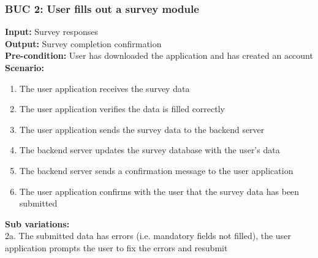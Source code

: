 \documentclass[12pt]{article}
\begin{document}
\subsubsection*{BUC 2: User fills out a survey module}
\textbf{Input:} Survey responses \\
\textbf{Output:} Survey completion confirmation \\
\textbf{Pre-condition:} User has downloaded the application and has created an account \\
\textbf{Scenario:} \\
\begin{enumerate}
  \item The user application receives the survey data
  \item The user application verifies the data is filled correctly
  \item The user application sends the survey data to the backend server
  \item The backend server updates the survey database with the user’s data
  \item The backend server sends a confirmation message to the user application
  \item The user application confirms with the user that the survey data has been submitted
\end{enumerate}
\textbf{Sub variations:} \\
2a. The submitted data has errors (i.e. mandatory fields not filled), the user application prompts the user to fix the errors and resubmit \\
\end{document}
